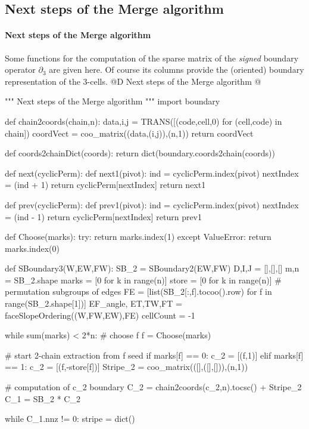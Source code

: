 \documentclass[11pt,oneside]{article}    %
\begin{document}
\subsection{Next steps of the Merge algorithm}

\paragraph{Next steps of the Merge algorithm}
Some functions for the computation of the sparse matrix of the \emph{signed} boundary operator $\partial_3$ are given here. Of course its columns provide the (oriented) boundary representation of the 3-cells.
@D Next steps of the Merge algorithm
@{""" Next steps of the Merge algorithm """  
import boundary
  
def chain2coords(chain,n):
	data,i,j = TRANS([(code,cell,0) for (cell,code) in chain])
	coordVect = coo_matrix((data,(i,j)),(n,1))
	return coordVect
	
def coords2chainDict(coords):
	return dict(boundary.coords2chain(coords))

def next(cyclicPerm):
	def next1(pivot):
		ind = cyclicPerm.index(pivot)
		nextIndex = (ind + 1) %
		return cyclicPerm[nextIndex]
	return next1

def prev(cyclicPerm):
	def prev1(pivot):
		ind = cyclicPerm.index(pivot)
		nextIndex = (ind - 1) %
		return cyclicPerm[nextIndex]
	return prev1

def Choose(marks):
	try: return marks.index(1)
	except ValueError: return marks.index(0)

def SBoundary3(W,EW,FW):
	SB_2 = SBoundary2(EW,FW)
	D,I,J = [],[],[]
	m,n = SB_2.shape
	marks = [0 for k in range(n)]
	store = [0 for k in range(n)]
	# permutation subgroups of edges
	FE = [list(SB_2[:,f].tocoo().row) for f in range(SB_2.shape[1])]
	EF_angle, ET,TW,FT = faceSlopeOrdering((W,FW,EW),FE)
	cellCount = -1

	while sum(marks) < 2*n:
		# choose f
		f = Choose(marks)
		
		# start 2-chain extraction from f seed
		if marks[f] == 0: c_2 = [(f,1)] 
		elif marks[f] == 1: c_2 = [(f,-store[f])] 	
		Stripe_2 = coo_matrix(([],([],[])),(n,1))
	
		# computation of c_2 boundary
		C_2 = chain2coords(c_2,n).tocsc() + Stripe_2
		C_1 = SB_2 * C_2

		while C_1.nnz != 0:	
			stripe = dict()
			
}
\end{document}
